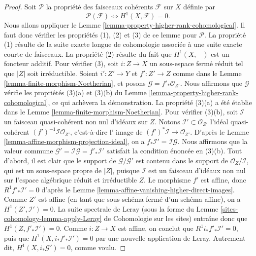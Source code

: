 \begin{proof}
\medskip\noindent
Soit $\mathcal{P}$ la propriété des faisceaux cohérents
$\mathcal{F}$ sur $X$ définie par
$$
\mathcal{P}(\mathcal{F}) \Leftrightarrow H^1(X, \mathcal{F}) = 0.
$$
Nous allons appliquer le Lemme \ref{lemma-property-higher-rank-cohomological}.
Il faut donc vérifier les propriétés (1), (2) et (3) de ce lemme pour $\mathcal{P}$.
La propriété (1) résulte de la suite exacte longue de cohomologie associée
à une suite exacte courte de faisceaux. La propriété (2) résulte du fait que
$H^1(X, -)$ est un foncteur additif. Pour vérifier (3), soit $i : Z \to X$
un sous-espace fermé réduit tel que $|Z|$ soit irréductible. Soient $i' : Z' \to Y$
et $f' : Z' \to Z$ comme dans le Lemme \ref{lemma-finite-morphism-Noetherian},
et posons $\mathcal{G} = f'_*\mathcal{O}_{Z'}$. Nous affirmons que
$\mathcal{G}$ vérifie les propriétés (3)(a) et (3)(b) du
Lemme \ref{lemma-property-higher-rank-cohomological},
ce qui achèvera la démonstration. La propriété (3)(a) a été établie dans le
Lemme \ref{lemma-finite-morphism-Noetherian}. Pour vérifier (3)(b), soit
$\mathcal{I}$ un faisceau quasi-cohérent non nul d'idéaux sur $Z$.
Notons $\mathcal{I}' \subset \mathcal{O}_{Z'}$ l'idéal quasi-cohérent
$(f')^{-1}\mathcal{I} \mathcal{O}_{Z'}$, c'est-à-dire l'
image de $(f')^*\mathcal{I} \to \mathcal{O}_{Z'}$.
D'après le Lemme \ref{lemma-affine-morphism-projection-ideal}, on a
$f_*\mathcal{I}' = \mathcal{I} \mathcal{G}$.
Nous affirmons que la valeur commune
$\mathcal{G}' = \mathcal{I} \mathcal{G} = f'_*\mathcal{I}'$
satisfait la condition énoncée en (3)(b).
Tout d'abord, il est clair que le support de $\mathcal{G}/\mathcal{G}'$
est contenu dans le support de $\mathcal{O}_Z/\mathcal{I}$,
qui est un sous-espace propre de $|Z|$, puisque $\mathcal{I}$ est un
faisceau d'idéaux non nul sur l'espace algébrique réduit et irréductible $Z$.
Le morphisme $f'$ est affine, donc $R^1f'_*\mathcal{I}' = 0$ d'après le
Lemme \ref{lemma-affine-vanishing-higher-direct-images}.
Comme $Z'$ est affine (en tant que sous-schéma fermé d'un schéma affine),
on a $H^1(Z', \mathcal{I}') = 0$. La suite spectrale de Leray
(sous la forme du
Lemme \ref{sites-cohomology-lemma-apply-Leray} de Cohomologie sur les sites)
entraîne donc que $H^1(Z, f'_*\mathcal{I}') = 0$.
Comme $i : Z \to X$ est affine, on conclut que
$R^1i_*f'_*\mathcal{I}' = 0$, puis que $H^1(X, i_*f'_*\mathcal{I}') = 0$
par une nouvelle application de Leray. Autrement dit, $H^1(X, i_*\mathcal{G}') = 0$,
comme voulu.
\end{proof}








